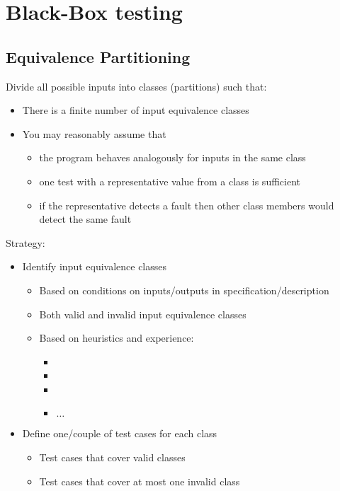 \section{Black-Box testing}

\subsection{Equivalence Partitioning}

Divide all possible inputs into classes (partitions) such that:
\begin{itemize}
	\item There is a finite number of input equivalence classes
	\item You may reasonably assume that
	\begin{itemize}
		\item the program behaves analogously for inputs in the same class
		\item one test with a representative value from a class is sufficient
		\item if the representative detects a fault
		then other class members would detect the same fault
	\end{itemize}
\end{itemize}


Strategy:
\begin{itemize}
	\item Identify input equivalence classes
	\begin{itemize}
		\item Based on conditions on inputs/outputs in specification/description
		\item Both valid and invalid input equivalence classes
		\item Based on heuristics and experience:
		\begin{itemize}
			\item
			\item
			\item
			\item$\ldots$
		\end{itemize}
	\end{itemize}
	\item Define one/couple of test cases for each class
	\begin{itemize}
		\item Test cases that cover valid classes
		\item Test cases that cover at most one invalid class
	\end{itemize}
\end{itemize}

